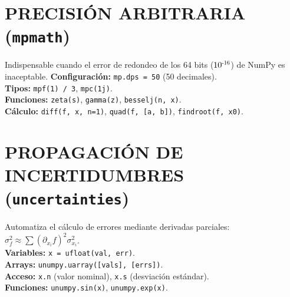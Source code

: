 


\section{PRECISIÓN ARBITRARIA (\texttt{mpmath})}
Indispensable cuando el error de redondeo de los 64 bits ($10^{\scalebox{0.7}{-16}}$) de NumPy es inaceptable.
\textbf{Configuración:} \texttt{mp.dps = 50} (50 decimales). \\
\textbf{Tipos:} \texttt{mpf(1) / 3}, \texttt{mpc(1j)}. \\
\textbf{Funciones:} \texttt{zeta(s)}, \texttt{gamma(z)}, \texttt{besselj(n, x)}. \\
\textbf{Cálculo:} \texttt{diff(f, x, n=1)}, \texttt{quad(f, [a, b])}, \texttt{findroot(f, x0)}.




\section{PROPAGACIÓN DE INCERTIDUMBRES (\texttt{uncertainties})} \vspace{-2pt}
Automatiza el cálculo de errores mediante derivadas parciales: $\sigma_f^2 \approx \sum ({\partial_{x_i} f})^2 \sigma_{x_i}^2$. \\[-2pt]
\textbf{Variables:} \texttt{x = ufloat(val, err)}. \\
\textbf{Arrays:} \texttt{unumpy.uarray([vals], [errs])}. \\
\textbf{Acceso:} \texttt{x.n} (valor nominal), \texttt{x.s} (desviación estándar). \\
\textbf{Funciones:} \texttt{unumpy.sin(x)}, \texttt{unumpy.exp(x)}.



